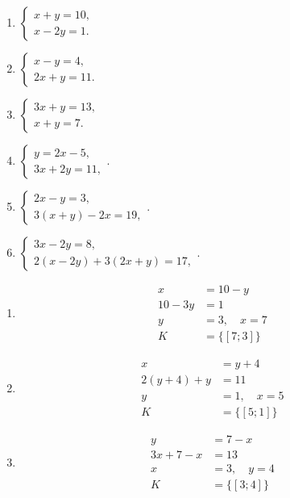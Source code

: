 \documentclass[11pt,a4paper]{article}
\begin{document}
\begin{zadaniReseniBox}[title={Domácí úkol}]
\begin{enumerate}[label=\alph*)]
\item
$\begin{cases}x+y=10,\\x-2y=1.\end{cases}$
\item
$\begin{cases}x-y=4,\\2x+y=11.\end{cases}$
\item
$\begin{cases}3x+y=13,\\x+y=7.\end{cases}$
\item
$\begin{cases}y=2x-5,\\3x+2y=11,\end{cases}$.
\item
$\begin{cases}2x-y=3,\\3(x+y)-2x=19,\end{cases}$.
\item
$\begin{cases}3x-2y=8,\\2(x-2y)+3(2x+y)=17,\end{cases}$.
\end{enumerate}
\tcblower
\begin{enumerate}[label=\alph*)]
\item
\[
\begin{aligned}
x&=10-y \\
 10-3y&=1 \\
 y&=3,\quad x=7 \\[2mm]
K &= \{[7;3]\}
\end{aligned}
\]
\item
\[
\begin{aligned}
x&=y+4 \\
 2(y+4)+y&=11 \\
 y&=1,\quad x=5 \\[2mm]
K &= \{[5;1]\}
\end{aligned}
\]
\item
\[
\begin{aligned}
y&=7-x \\
 3x+7-x&=13 \\
 x&=3,\quad y=4 \\[2mm]
K &= \{[3;4]\}
\end{aligned}
\]
\end{enumerate}
\end{zadaniReseniBox}
\end{document}

